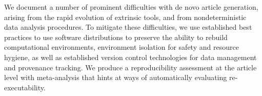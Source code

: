 We document a number of prominent difficulties with de novo article generation, arising from the rapid evolution of extrinsic tools, and from nondeterministic data analysis procedures.
To mitigate these difficulties, we use established best practices to use software distributions to preserve the ability to rebuild computational environments, environment isolation for safety and resource hygiene, as well as established version control technologies for data management and provenance tracking.
We produce a reproducibility assessment at the article level with meta-analysis that hints at ways of automatically evaluating re-executability.

